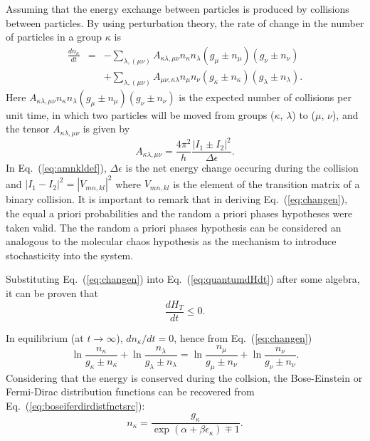 Assuming that the energy exchange between particles is produced by collisions between particles.
By using perturbation theory, the rate of change in the number of particles in a group $\kappa$ is
%
\begin{eqnarray}\label{eq:changen}
    \frac{d n_{\kappa}}{dt}&=&-\sum_{\lambda,(\mu \nu)}A_{\kappa\lambda,\mu\nu} n_{\kappa}n_{\lambda}(g_{\mu}\pm n_{\mu})(g_{\nu}\pm n_{\nu})\nonumber \\
    &&+\sum_{\lambda,(\mu \nu)}A_{\mu\nu,\kappa\lambda} n_{\mu}n_{\nu}(g_{\kappa}\pm n_{\kappa})(g_{\lambda}\pm n_{\lambda}).
\end{eqnarray}
%
Here $A_{\kappa\lambda,\mu\nu}n_{\kappa}n_{\lambda}(g_{\mu}\pm n_{\mu})(g_{\nu}\pm n_{\nu})$ is the
expected number of collisions per unit time, in which two particles will be moved from groups
($\kappa$, $\lambda$) to ($\mu$, $\nu$), and the tensor $A_{\kappa\lambda,\mu\nu}$ is given by
%
\begin{equation}\label{eq:amnkldef}
  A_{\kappa\lambda,\mu\nu}=\frac{4\pi^{2}}{h}\frac{|I_1\pm I_2|^2}{\Delta \epsilon}.
\end{equation}
%
In Eq.~(\ref{eq:amnkldef}), $\Delta\epsilon$ is the net energy change occuring during the
collision and $|I_1-I_2|^2=|V_{mn,kl}|^2$ where
$V_{mn,kl}$ is the element of the transition matrix of a binary collision.
It is important to remark that in deriving Eq.~(\ref{eq:changen}), the equal a priori
probabilities and the random a priori phases hypotheses were taken valid. The 
the random a priori phases hypothesis can be
considered an analogous to the molecular chaos hypothesis
\cite{bib:das2018} as the mechanism to introduce stochasticity into the system.

Substituting Eq.~(\ref{eq:changen}) into Eq.~(\ref{eq:quantumdHdt}) after some algebra, it can be proven that
%
\begin{equation}
    \frac{dH_T}{dt}\leq 0. \label{eq:H-theorem-tolman}
\end{equation}
%

In equilibrium (at $t\to\infty$), $dn_{\kappa}/dt=0$, hence from Eq.~(\ref{eq:changen})
%
\begin{equation}\label{eq:boseiferdirdistfnctsrc}
    \ln \frac{n_{\kappa}}{g_{\kappa}\pm n_{\kappa}}+\ln \frac{n_{\lambda}}{g_{\lambda}\pm n_{\lambda}}=\ln \frac{n_{\mu}}{g_{\mu}\pm n_{\nu}}+\ln \frac{n_{\nu}}{g_{\nu}\pm n_{\nu}}.
\end{equation}
%
Considering that the energy is conserved during the collsion, the Bose-Einstein or Fermi-Dirac distribution
functions can be recovered from Eq.~(\ref{eq:boseiferdirdistfnctsrc}):
%
\begin{equation}
   n_{\kappa}=\frac{g_{\kappa}}{\exp(\alpha+\beta\epsilon_{\kappa})\mp1}.
\end{equation}
%

